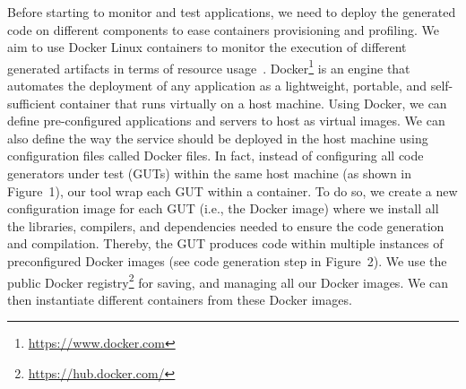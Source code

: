 Before starting to monitor and test applications, we need to deploy the generated code on different components to ease containers provisioning and profiling. 
We aim to use Docker Linux containers to monitor the execution of different generated artifacts in terms of resource usage~\cite{merkel2014docker}. 
Docker\footnote{\url{https://www.docker.com}} is an engine that automates the deployment of any application as a lightweight, portable, and self-sufficient container that runs virtually on a host machine. 
Using Docker, we can define pre-configured applications and servers to host as virtual images. We can also define the way the service should be deployed in the host machine using configuration files called Docker files. 
In fact, instead of configuring all code generators under test (GUTs) within the same host machine (as shown in Figure~1), our tool wrap each GUT within a container. To do so, we create a new configuration image for each GUT (i.e., the Docker image) where we install all the libraries, compilers, and dependencies needed to ensure the code generation and compilation. Thereby, the GUT produces code within multiple instances of preconfigured Docker images (see code generation step in Figure~2).
We use the public Docker registry\footnote{\url{https://hub.docker.com/}} for  saving, and managing all our Docker images. 
We can then instantiate different containers from these Docker images. 

